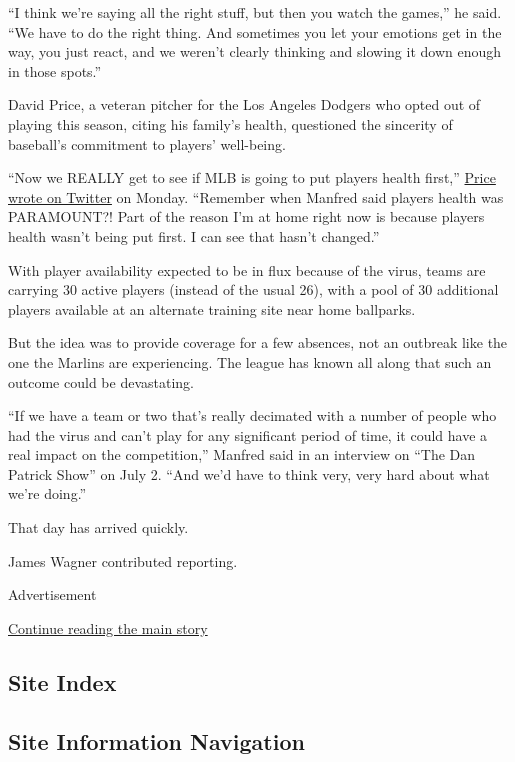 ``I think we're saying all the right stuff, but then you watch the
games,'' he said. ``We have to do the right thing. And sometimes you let
your emotions get in the way, you just react, and we weren't clearly
thinking and slowing it down enough in those spots.''

David Price, a veteran pitcher for the Los Angeles Dodgers who opted out
of playing this season, citing his family's health, questioned the
sincerity of baseball's commitment to players' well-being.

``Now we REALLY get to see if MLB is going to put players health
first,''
\href{https://twitter.com/DAVIDprice24/status/1287793458602635265}{Price
wrote on Twitter} on Monday. ``Remember when Manfred said players health
was PARAMOUNT?! Part of the reason I'm at home right now is because
players health wasn't being put first. I can see that hasn't changed.''

With player availability expected to be in flux because of the virus,
teams are carrying 30 active players (instead of the usual 26), with a
pool of 30 additional players available at an alternate training site
near home ballparks.

But the idea was to provide coverage for a few absences, not an outbreak
like the one the Marlins are experiencing. The league has known all
along that such an outcome could be devastating.

``If we have a team or two that's really decimated with a number of
people who had the virus and can't play for any significant period of
time, it could have a real impact on the competition,'' Manfred said in
an interview on ``The Dan Patrick Show'' on July 2. ``And we'd have to
think very, very hard about what we're doing.''

That day has arrived quickly.

James Wagner contributed reporting.

Advertisement

\protect\hyperlink{after-bottom}{Continue reading the main story}

\hypertarget{site-index}{%
\subsection{Site Index}\label{site-index}}

\hypertarget{site-information-navigation}{%
\subsection{Site Information
Navigation}\label{site-information-navigation}}

